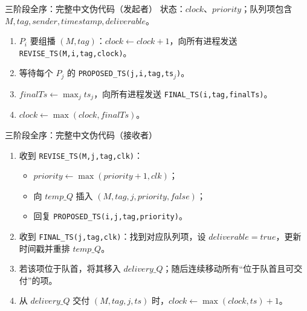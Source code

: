 \documentclass[UTF8,fontset=none,aspectratio=169,10pt]{beamer}
\begin{document}
{\begin{frame}{三阶段全序：完整中文伪代码（发起者）}
\scriptsize
状态：$clock$、$priority$；队列项包含 $M,tag,sender,timestamp,deliverable$。
\begin{enumerate}
  \item $P_i$ 要组播 $(M,tag)$：$clock\leftarrow clock+1$，向所有进程发送 \texttt{REVISE\_TS(M,i,tag,clock)}。
  \item 等待每个 $P_j$ 的 \texttt{PROPOSED\_TS(j,i,tag,ts$_j$)}。
  \item $finalTs\leftarrow\max_j ts_j$，向所有进程发送 \texttt{FINAL\_TS(i,tag,finalTs)}。
  \item $clock\leftarrow\max(clock,finalTs)$。
\end{enumerate}
\normalsize
\vfill
{}
\end{frame}

\begin{frame}{三阶段全序：完整中文伪代码（接收者）}
\scriptsize
\begin{enumerate}
  \item 收到 \texttt{REVISE\_TS(M,j,tag,clk)}：
  \begin{itemize}\scriptsize
    \item $priority\leftarrow\max(priority+1,clk)$；
    \item 向 $temp\_Q$ 插入 $(M,tag,j,priority,false)$；
    \item 回复 \texttt{PROPOSED\_TS(i,j,tag,priority)}。
  \end{itemize}
  \item 收到 \texttt{FINAL\_TS(j,tag,clk)}：找到对应队列项，设 $deliverable=true$，更新时间戳并重排 $temp\_Q$。
  \item 若该项位于队首，将其移入 $delivery\_Q$；随后连续移动所有“位于队首且可交付”的项。
  \item 从 $delivery\_Q$ 交付 $(M,tag,j,ts)$ 时，$clock\leftarrow\max(clock,ts)+1$。
\end{enumerate}
\normalsize
{}
\end{frame}

}
\end{document}
